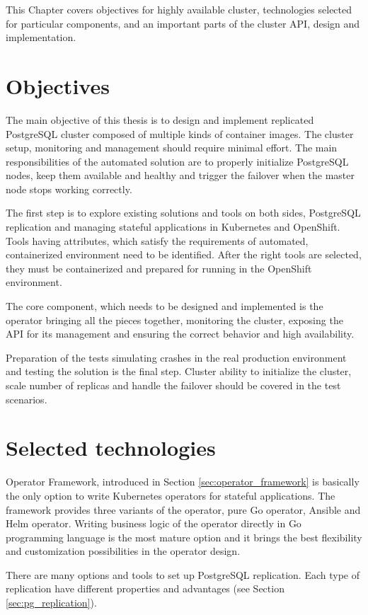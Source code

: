 \documentclass[
  digital, %
  twoside, %
  table,   %
  lof,     %
  lot,     %
]{fithesis3}
\begin{document}
This Chapter covers objectives for highly available cluster, technologies selected for particular components, and an important parts of the cluster API, design and implementation.

\section{Objectives}
The main objective of this thesis is to design and implement replicated PostgreSQL cluster composed of multiple kinds of container images. The cluster setup, monitoring and management should require minimal effort. The main responsibilities of the automated solution are to properly initialize PostgreSQL nodes, keep them available and healthy and trigger the failover when the master node stops working correctly.

The first step is to explore existing solutions and tools on both sides, PostgreSQL replication and managing stateful applications in Kubernetes and OpenShift. Tools having attributes, which satisfy the requirements of automated, containerized environment need to be identified. After the right tools are selected, they must be containerized and prepared for running in the OpenShift environment.

The core component, which needs to be designed and implemented is the operator bringing all the pieces together, monitoring the cluster, exposing the API for its management and ensuring the correct behavior and high availability.

Preparation of the tests simulating crashes in the real production environment and testing the solution is the final step. Cluster ability to initialize the cluster, scale number of replicas and handle the failover should be covered in the test scenarios.

\section{Selected technologies} \label{sec:selected_technologies}
Operator Framework, introduced in Section \ref{sec:operator_framework} is basically the only option to write Kubernetes operators for stateful applications. The framework provides three variants of the operator, pure Go operator, Ansible and Helm operator. Writing business logic of the operator directly in Go programming language is the most mature option and it brings the best flexibility and customization possibilities in the operator design.

There are many options and tools to set up PostgreSQL replication. Each type of replication have different properties and advantages (see Section \ref{sec:pg_replication}).
\end{document}
